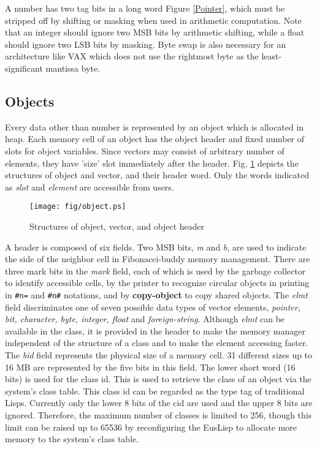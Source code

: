 A number has two tag bits in a long word {Figure \ref{Pointer}},
which must be stripped off by shifting or masking 
when used in arithmetic computation.
Note that an integer should ignore two MSB bits by arithmetic shifting,
while a float should ignore two LSB bits by masking.
Byte swap is also necessary for an architecture like VAX which does not use
the rightmost byte as the least-significant mantissa byte.


\subsection{Objects}
Every data  other than number is represented by an object which is allocated
in heap. 
Each memory cell of an object has the object header and fixed number of 
slots for object variables.
Since vectors may consist of arbitrary number of elements,
they have 'size' slot immediately after the header.
Fig. \ref{ObjectFig} depicts the structures of object and vector, and their
header word.
Only the words indicated as {\em slot} and {\em element}
are accessible from users.

\begin{figure}[hbt]
\begin{center}
\texttt{[image: fig/object.ps]}
\end{center}
\caption{\label{ObjectFig}Structures of object, vector, and object header}
\end{figure}

A header is composed of six fields.
Two MSB bits, {\em m} and {\em b},
are used to indicate the side of the neighbor cell
in Fibonacci-buddy memory management.
There are three mark bits in the {\em mark} field, each of which
is used by the garbage collector to identify accessible cells,
by the printer to recognize circular objects in printing in {\tt \#n=} and
{\tt \#n\#} notations,
and by {\bf copy-object} to copy shared objects.
The {\em elmt} field discriminates one of seven possible data types
of vector elements, {\em pointer, bit, character, byte, integer, float}
and {\em foreign-string}.
Although {\em elmt} can be available in the class, 
it is provided in the header to make the memory manager independent of
the structure of a class and to make the element accessing faster.
The {\em bid} field represents the physical size of a memory cell.
31 different sizes up to 16 MB are represented by the five bits in this field.
The lower short word (16 bits) is used for the class id.
This is used to retrieve the class of an object via the system's class table.
This class id can be regarded as the type tag of traditional Lisps.
Currently only the lower 8 bits of the cid are used and the upper 8 bits
are ignored.
Therefore, the maximum number of classes is limited to 256, though
this limit can be raised up to 65536 by reconfiguring the EusLisp to allocate
more memory to the system's class table.


